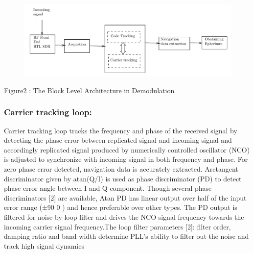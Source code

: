 \documentclass[onecolumn]{article}
\begin{document}
\begin{enumerate}
\begin{normalsize}
\begin{figure}[!h]%
\centering%
\includegraphics{figures/block2}
\end{figure} 

\end{normalsize}
\begin{Large}
\begin{center}
Figure2 : The Block Level Architecture in Demodulation
\end{center}


\subsubsection{Carrier tracking loop:}Carrier tracking loop tracks the frequency and phase of the
received signal by detecting the phase error between replicated signal and incoming signal and accordingly replicated signal produced by numerically controlled oscillator (NCO) is adjusted to synchronize with incoming signal in both frequency and phase. For zero phase error detected, navigation data is accurately extracted. Arctangent discriminator given by atan(Q/I) is used as phase
discriminator (PD) to detect phase error angle between I and Q component. Though several phase discriminators [2] are available, Atan PD has linear output over half of the input
error range (±90 0 ) and hence preferable over other types. The PD output is filtered for noise by loop filter and drives the NCO signal frequency towards the incoming carrier signal frequency.The loop filter parameters [2]: filter order, damping ratio and band width determine PLL’s ability to filter out the noise and track high signal dynamics


\end{Large}
\end{enumerate}
\end{document}
